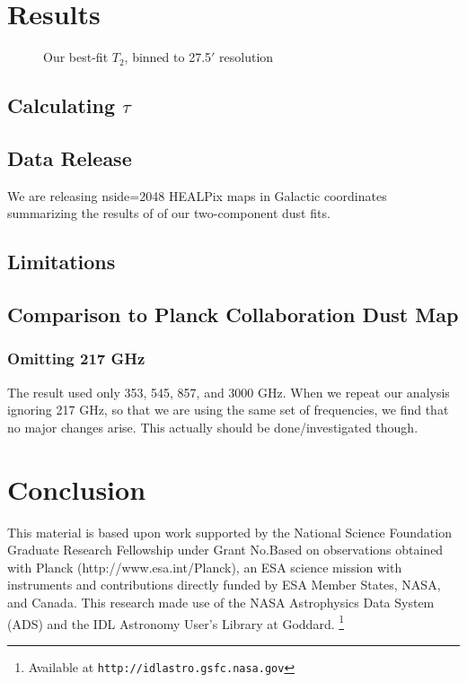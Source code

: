 \documentclass{emulateapj}
\begin{document}
\section{Results}
\label{sec:results}

\begin{figure*}
\begin{center}
\caption{Our best-fit $T_2$, binned to 27.5$'$ resolution}
\end{center}
\end{figure*}

\subsection{Calculating $\tau$}

\subsection{Data Release}
We are releasing nside=2048 HEALPix maps in Galactic coordinates summarizing 
the results of of our two-component dust fits.


\subsection{Limitations}

\subsection{Comparison to Planck Collaboration Dust Map}

\subsubsection{Omitting 217 GHz}
The \cite{planckdust} result used only 353, 545, 857, and 3000 GHz. When we 
repeat our analysis ignoring 217 GHz, so that we are using the same
set of frequencies, we find that no major changes arise. This actually
should be done/investigated though.

\section{Conclusion}
\label{sec:conclusion}

This material is based upon work supported by the National Science Foundation 
Graduate Research Fellowship under Grant No.Based on observations obtained with
 Planck (http://www.esa.int/Planck), an ESA science mission with instruments 
and contributions directly funded by ESA Member States, NASA, and Canada. This 
research made use of the NASA Astrophysics Data System (ADS) and the IDL 
Astronomy User's Library at Goddard. \footnote{Available at 
\texttt{http://idlastro.gsfc.nasa.gov}}



\end{document}
